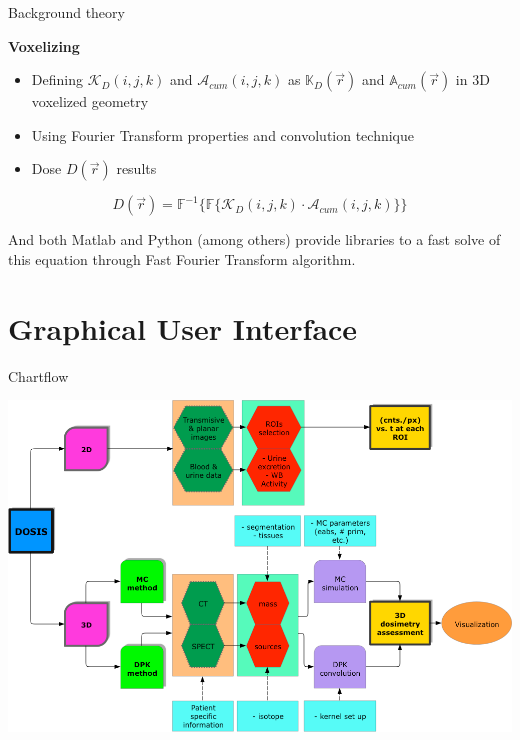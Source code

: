 \documentclass[ignorenonframetext,]{beamer}
\begin{document}
\begin{frame}{Background theory}
\protect\hypertarget{background-theory}{}

\textbf{Voxelizing}

\begin{itemize}
\item
  Defining \(\mathcal{K}_D(i,j,k)\) and \(\mathcal{A}_{cum}(i,j,k)\) as
  \(\mathbb{K}_{D}(\vec{r})\) and \(\mathbb{A}_{cum}(\vec{r})\) in 3D
  voxelized geometry
\item
  Using Fourier Transform properties and convolution technique
\item
  Dose \(D(\vec{r})\) results
\end{itemize}

\begin{equation}
D(\vec{r}) = \mathbb{F}^{-1}\{\mathbb{F}\{\mathcal{K}_{D}(i,j,k) \cdot \mathcal{A}_{cum}(i,j,k)\}\}
\end{equation}

And both Matlab and Python (among others) provide libraries to a fast
solve of this equation through Fast Fourier Transform algorithm.

\end{frame}

\hypertarget{graphical-user-interface}{%
\section{Graphical User Interface}\label{graphical-user-interface}}

\begin{frame}{Chartflow}
\protect\hypertarget{chartflow}{}

\includegraphics{imgs/dosis-chartflow.png}

\end{frame}
\end{document}
